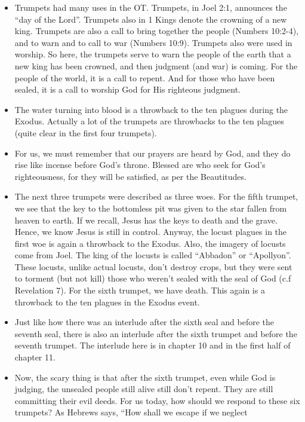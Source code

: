 \begin{itemize}
  \item{Trumpets had many uses in the OT.  Trumpets, in Joel 2:1, announces
  the ``day of the Lord''.  Trumpets also in 1 Kings denote the crowning of a
  new king.  Trumpets are also a call to bring together the people (Numbers
  10:2-4), and to warn and to call to war (Numbers 10:9).  Trumpets also were
  used in worship.  So here, the trumpets serve to warn the people of the
  earth that a new king has been crowned, and then judgment (and war) is
  coming.  For the people of the world, it is a call to repent.  And for
  those who have been sealed, it is a call to worship God for His righteous
  judgment.  }
  \item{The water turning into blood is a throwback to the ten plagues during
  the Exodus.  Actually a lot of the trumpets are throwbacks to the ten
  plagues (quite clear in the first four trumpets).  }
  \item{For us, we must remember that our prayers are heard by God, and they
  do rise like incense before God's throne.  Blessed are who seek for God's
  righteousness, for they will be satisfied, as per the Beautitudes.}
  \item{The next three trumpets were described as three woes.  For the fifth
  trumpet, we see that the key to the bottomless pit was given to the star
  fallen from heaven to earth.  If we recall, Jesus has the keys to death and
  the grave.  Hence, we know Jesus is still in control.  Anyway, the locust
  plagues in the first woe is again a throwback to the Exodus.  Also, the
  imagery of locusts come from Joel.  The king of the locusts is called
  ``Abbadon'' or ``Apollyon''.  These locusts, unlike actual locusts, don't
  destroy crops, but they were sent to torment (but not kill) those who
  weren't sealed with the seal of God (c.f Revelation 7).  For the sixth
  trumpet, we have death.  This again is a throwback to the ten plagues in
  the Exodus event.  }
  \item{Just like how there was an interlude after the sixth seal and before
  the seventh seal, there is also an interlude after the sixth trumpet and
  before the seventh trumpet. The interlude here is in chapter 10 and in the first half of chapter 11.}
  \item{Now, the scary thing is that after the sixth trumpet, even while God
  is judging, the unsealed people still alive still don't repent.  They are
  still committing their evil deeds.  For us today, how should we respond to
  these six trumpets?  As Hebrews says, ``How shall we escape if we neglect
}
\end{itemize}

